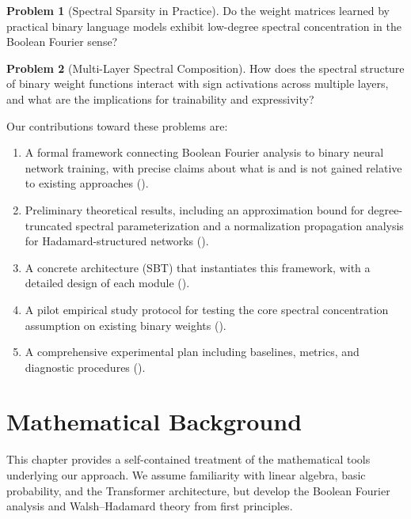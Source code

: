 \documentclass[12pt,a4paper]{article}
\theoremstyle{plain}
\theoremstyle{definition}
\newtheorem{problem}{Problem}
\theoremstyle{remark}
\begin{document}
\begin{problem}[Spectral Sparsity in Practice]\label{prob:sparsity}
Do the weight matrices learned by practical binary language models exhibit low-degree spectral concentration in the Boolean Fourier sense?
\end{problem}

\begin{problem}[Multi-Layer Spectral Composition]\label{prob:composition}
How does the spectral structure of binary weight functions interact with sign activations across multiple layers, and what are the implications for trainability and expressivity?
\end{problem}

Our contributions toward these problems are:
\begin{enumerate}[label=(\alph*)]
    \item A formal framework connecting Boolean Fourier analysis to binary neural network training, with precise claims about what is and is not gained relative to existing approaches ().
    \item Preliminary theoretical results, including an approximation bound for degree-truncated spectral parameterization and a normalization propagation analysis for Hadamard-structured networks ().
    \item A concrete architecture (SBT) that instantiates this framework, with a detailed design of each module ().
    \item A pilot empirical study protocol for testing the core spectral concentration assumption on existing binary weights ().
    \item A comprehensive experimental plan including baselines, metrics, and diagnostic procedures ().
\end{enumerate}


\newpage
\section{Mathematical Background}\label{sec:background}

This chapter provides a self-contained treatment of the mathematical tools underlying our approach. We assume familiarity with linear algebra, basic probability, and the Transformer architecture, but develop the Boolean Fourier analysis and Walsh--Hadamard theory from first principles.
\end{document}
